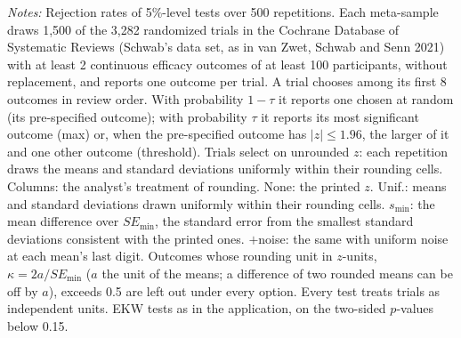 \begin{table}[htbp]
\begin{minipage}{\linewidth}\footnotesize\textit{Notes:} Rejection rates of 5\%-level tests over 500 repetitions. Each meta-sample draws 1{,}500 of the 3{,}282 randomized trials in the Cochrane Database of Systematic Reviews (Schwab's data set, as in van Zwet, Schwab and Senn 2021) with at least 2 continuous efficacy outcomes of at least 100 participants, without replacement, and reports one outcome per trial. A trial chooses among its first 8 outcomes in review order. With probability $1 - \tau$ it reports one chosen at random (its pre-specified outcome); with probability $\tau$ it reports its most significant outcome (max) or, when the pre-specified outcome has $|z| \le 1.96$, the larger of it and one other outcome (threshold). Trials select on unrounded $z$: each repetition draws the means and standard deviations uniformly within their rounding cells. Columns: the analyst's treatment of rounding. None: the printed $z$. Unif.: means and standard deviations drawn uniformly within their rounding cells. $s_{\min}$: the mean difference over $SE_{\min}$, the standard error from the smallest standard deviations consistent with the printed ones. $+$noise: the same with uniform noise at each mean's last digit. Outcomes whose rounding unit in $z$-units, $\kappa = 2a/SE_{\min}$ ($a$ the unit of the means; a difference of two rounded means can be off by $a$), exceeds 0.5 are left out under every option. Every test treats trials as independent units. EKW tests as in the application, on the two-sided $p$-values below 0.15.\end{minipage}
\end{table}
